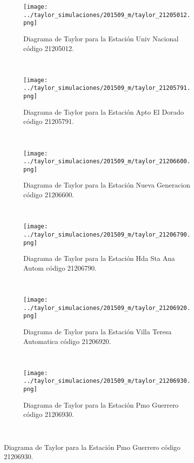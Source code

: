 \begin{figure}[H]


\begin{subfigure}[normla]{0.5\textwidth}
\caption{Diagrama de Taylor para la Estación Univ Nacional código 21205012.}
\texttt{[image: ../taylor\_simulaciones/201509\_m/taylor\_21205012.png]}
\end{subfigure}
~
\begin{subfigure}[normla]{0.5\textwidth}
\caption{Diagrama de Taylor para la Estación Apto El Dorado código 21205791.}
\texttt{[image: ../taylor\_simulaciones/201509\_m/taylor\_21205791.png]}
\end{subfigure}
~
\begin{subfigure}[normla]{0.5\textwidth}
\caption{Diagrama de Taylor para la Estación Nueva Generacion código 21206600.}
\texttt{[image: ../taylor\_simulaciones/201509\_m/taylor\_21206600.png]}
\end{subfigure}
~
\begin{subfigure}[normla]{0.5\textwidth}
\caption{Diagrama de Taylor para la Estación Hda Sta Ana Autom código 21206790.}
\texttt{[image: ../taylor\_simulaciones/201509\_m/taylor\_21206790.png]}
\end{subfigure}
~
\begin{subfigure}[normla]{0.5\textwidth}
\caption{Diagrama de Taylor para la Estación Villa Teresa Automatica código 21206920.}
\texttt{[image: ../taylor\_simulaciones/201509\_m/taylor\_21206920.png]}
\end{subfigure}
~
\begin{subfigure}[normla]{0.5\textwidth}
\caption{Diagrama de Taylor para la Estación Pmo Guerrero código 21206930.}
\texttt{[image: ../taylor\_simulaciones/201509\_m/taylor\_21206930.png]}
\end{subfigure}
~
\end{figure}
           
